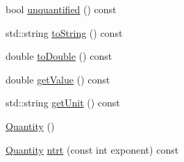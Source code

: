 \begin{DoxyCompactItemize}
bool \hyperlink{classmunits_1_1_quantity_a09ed96601cab6f56278e3bf44dc82b70}{unquantified} () const
\item 
std\+::string \hyperlink{classmunits_1_1_quantity_a3f09b8e8dbd47f32a21f94591508c0fe}{to\+String} () const
\item 
double \hyperlink{classmunits_1_1_quantity_aadf35d14997bb3e58d8d2681f7c24ae3}{to\+Double} () const
\item 
double \hyperlink{classmunits_1_1_quantity_aae7dc378d4da3a9466edc958626f13d3}{get\+Value} () const
\item 
std\+::string \hyperlink{classmunits_1_1_quantity_a2de8a125226f981bf9a1d5a47b5957bb}{get\+Unit} () const
\item 
\hyperlink{classmunits_1_1_quantity_a0b43d7b58dbb07aca7382ef2630779d7}{Quantity} ()
\item 
\hyperlink{classmunits_1_1_quantity}{Quantity} \hyperlink{classmunits_1_1_quantity_aa46193a0c20d60713d279eb0b7a1da1f}{ntrt} (const int exponent) const
\end{DoxyCompactItemize}
